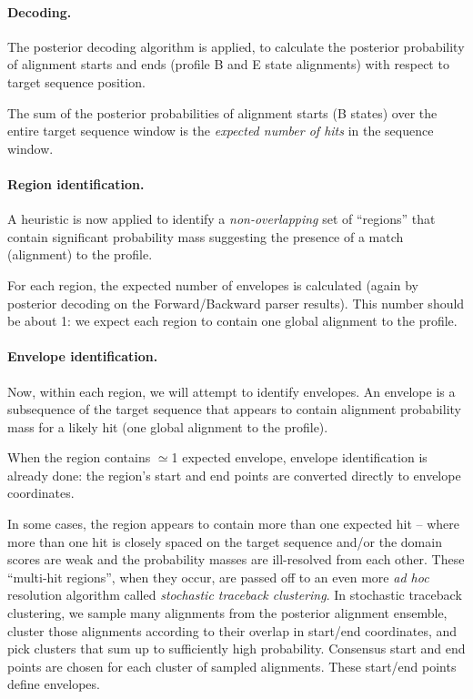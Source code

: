 \begin{sreoutput}
\paragraph{Decoding.}
The posterior decoding algorithm is applied, to calculate the
posterior probability of alignment starts and ends (profile B and E
state alignments) with respect to target sequence position.

The sum of the posterior probabilities of alignment starts (B states)
over the entire target sequence window is the \emph{expected number of
hits} in the sequence window.

\paragraph{Region identification.}

A heuristic is now applied to identify a \emph{non-overlapping} set of
``regions'' that contain significant probability mass suggesting the
presence of a match (alignment) to the profile.

For each region, the expected number of envelopes is calculated (again
by posterior decoding on the Forward/Backward parser results). This
number should be about 1: we expect each region to contain one global
alignment to the profile. 

\paragraph{Envelope identification.}

Now, within each region, we will attempt to identify envelopes.
An envelope is a subsequence of the target sequence that
appears to contain alignment probability mass for a likely hit (one
global alignment to the profile).

When the region contains $\simeq$1 expected envelope, envelope
identification is already done: the region's start and end points are
converted directly to envelope coordinates.

In some cases, the region appears to contain more than
one expected hit -- where more than one hit is closely spaced on
the target sequence and/or the domain scores are weak and the
probability masses are ill-resolved from each other. These
``multi-hit regions'', when they occur, are passed off to an even
more \emph{ad hoc} resolution algorithm called \emph{stochastic
  traceback clustering}. In stochastic traceback clustering, we sample
many alignments from the posterior alignment ensemble, cluster those
alignments according to their overlap in start/end coordinates, and
pick clusters that sum up to sufficiently high probability. Consensus
start and end points are chosen for each cluster of sampled
alignments. These start/end points define envelopes.


\end{sreoutput}
